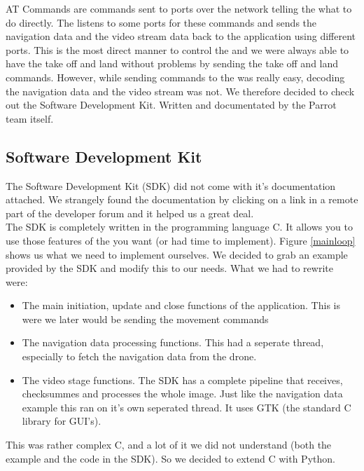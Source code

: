 AT Commands are commands sent to ports over the network telling the \Ardrone what to do directly. The \Ardrone listens to some ports for these commands and sends the 
navigation data and the video stream data back to the application using different ports. This is the most direct manner to control the \Ardrone and we were always able
to have the \Ardrone take off and land without problems by sending the take off and land commands. However, while sending commands to the \Ardrone was really easy, decoding
the navigation data and the video stream was not. We therefore decided to check
out the Software Development Kit. Written and documentated by the Parrot team itself. 

\subsection{Software Development Kit}
The Software Development Kit (SDK) did not come with it's documentation attached. We strangely found the documentation by clicking on a link in a remote part of the 
\Ardrone developer forum and it helped us a great deal. \\

The SDK is completely written in the programming language C. It allows you to use those features of the \Ardrone you want (or had time to implement). Figure \ref{mainloop}
shows us what we need to implement ourselves. We decided to grab an example
provided by the SDK and modify this to our needs. What we had to rewrite were:
\begin{itemize}
    \item The main initiation, update and close functions of the application. This is were we later would be sending the movement commands
    \item The navigation data processing functions. This had a seperate thread, especially to fetch the navigation data from the drone.
    \item The video stage functions. The SDK has a complete pipeline that receives, checksummes and processes the whole image. Just like the navigation data example
this ran on it's own seperated thread. It uses GTK (the standard C library for GUI's). 
\end{itemize}
This was rather complex C, and a lot of it we did not understand (both the example and the code in the SDK). So we decided to extend C with Python.

